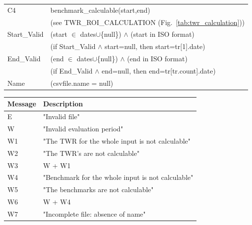 \documentclass[runningheads,12pt]{article}
\begin{document}
{\begin{longtable}{|l|p{12cm}|}
\hline
C4 & benchmark\_calculable(start,end)\\
&(see TWR\_ROI\_CALCULATION (Fig.~\ref{tab:twr_calculation}))\\

\hline
 Start\_Valid & (start $\in$ dates$\cup$\{null\}) $\wedge$ (start in ISO format)\\
& (if Start\_Valid $\wedge$ start=null, then start=tr[1].date)\\

\hline
 End\_Valid & (end $\in$ dates$\cup$\{null\}) $\wedge$ (end in ISO format)\\
&(if End\_Valid $\wedge$ end=null, then end=tr[tr.count].date)\\

\hline
Name & (csvfile.name = null)\\

\hline
\end{longtable}

\centering
\begin{longtable}{|l|p{13cm}|}
\hline
\textbf{Message} & \textbf{Description}\\

\hline
 E & "Invalid file"\\

\hline
W & "Invalid evaluation period"\\

\hline
W1 & "The TWR for the whole input is not calculable"\\

\hline
W2 & "The TWR's are not calculable"\\

\hline
W3 & W + W1\\

\hline
W4 &  "Benchmark for the whole input is not calculable"\\

\hline
W5 & "The benchmarks are not calculable"\\

\hline
W6 & W + W4\\

\hline
W7 & "Incomplete file: absence of name"\\

\hline

\end{longtable}
}
\end{document}
